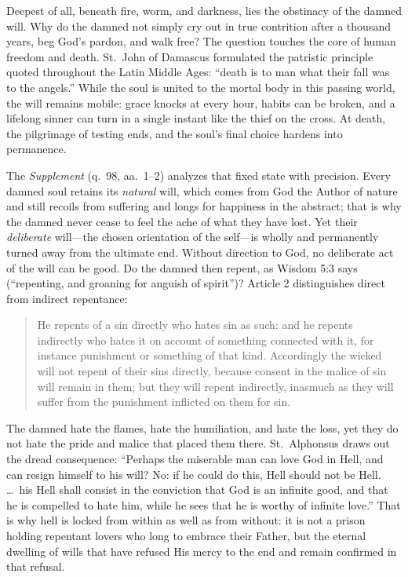 Deepest of all, beneath fire, worm, and darkness, lies the obstinacy of the damned will. Why do the damned not simply cry out in true contrition after a thousand years, beg God's pardon, and walk free? The question touches the core of human freedom and death. St.\ John of Damascus formulated the patristic principle quoted throughout the Latin Middle Ages: ``death is to man what their fall was to the angels.'' While the soul is united to the mortal body in this passing world, the will remains mobile: grace knocks at every hour, habits can be broken, and a lifelong sinner can turn in a single instant like the thief on the cross. At death, the pilgrimage of testing ends, and the soul's final choice hardens into permanence.

The \textit{Supplement} (q.\ 98, aa.\ 1--2) analyzes that fixed state with precision. Every damned soul retains its \textit{natural} will, which comes from God the Author of nature and still recoils from suffering and longs for happiness in the abstract; that is why the damned never cease to feel the ache of what they have lost. Yet their \textit{deliberate} will---the chosen orientation of the self---is wholly and permanently turned away from the ultimate end. Without direction to God, no deliberate act of the will can be good. Do the damned then repent, as Wisdom 5:3 says (``repenting, and groaning for anguish of spirit'')? Article 2 distinguishes direct from indirect repentance:

\begin{quote}
He repents of a sin directly who hates sin as such: and he repents indirectly who hates it on account of something connected with it, for instance punishment or something of that kind. Accordingly the wicked will not repent of their sins directly, because consent in the malice of sin will remain in them; but they will repent indirectly, inasmuch as they will suffer from the punishment inflicted on them for sin.
\end{quote}

The damned hate the flames, hate the humiliation, and hate the loss, yet they do not hate the pride and malice that placed them there. St.\ Alphonsus draws out the dread consequence: ``Perhaps the miserable man can love God in Hell, and can resign himself to his will? No: if he could do this, Hell should not be Hell. \dots\ his Hell shall consist in the conviction that God is an infinite good, and that he is compelled to hate him, while he sees that he is worthy of infinite love.'' That is why hell is locked from within as well as from without: it is not a prison holding repentant lovers who long to embrace their Father, but the eternal dwelling of wills that have refused His mercy to the end and remain confirmed in that refusal.
